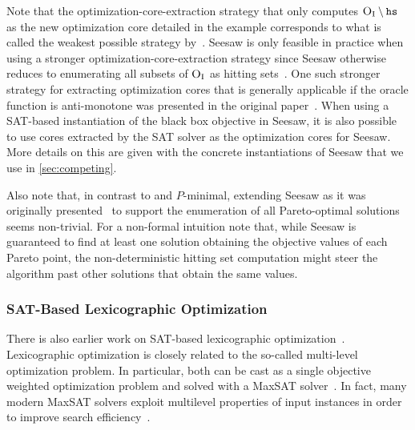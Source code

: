 Note that the optimization-core-extraction strategy that only computes $\textsc{O}_{\text{I}} \setminus \texttt{hs}$ as the new optimization core detailed in the example corresponds to what is called the weakest possible strategy by~\textcite{DBLP:conf/cp/JanotaMSM21}.
Seesaw is only feasible in practice when using a stronger optimization-core-extraction strategy since Seesaw otherwise reduces to enumerating all subsets of $\textsc{O}_{\text{I}}$ as hitting sets~\autocite{DBLP:conf/cp/JanotaMSM21}.
One such stronger strategy for extracting optimization cores that is generally applicable if the oracle function is anti-monotone was presented in the original paper~\autocite{DBLP:conf/cp/JanotaMSM21}.
When using a SAT-based instantiation of the black box objective in Seesaw, it is also possible to use cores extracted by the SAT solver as the optimization cores for Seesaw.
More details on this are given with the concrete instantiations of Seesaw that we use in \cref{sec:competing}.

Also note that, in contrast to \algname{} and $P$-minimal, extending Seesaw as it was originally presented~\autocite{DBLP:conf/cp/JanotaMSM21} to support the enumeration of all Pareto-optimal solutions seems non-trivial.
For a non-formal intuition note that, while Seesaw is guaranteed to find at least one solution obtaining the objective values of each Pareto point, the non-deterministic hitting set computation might steer the algorithm past other solutions that obtain the same values.

\subsubsection{SAT-Based Lexicographic Optimization\label{sec:lex-opt}}

There is also earlier work on SAT-based lexicographic optimization~\autocites{DBLP:journals/ors/EhrgottG00,DBLP:conf/ijcai/ArgelichLS09,DBLP:journals/amai/Marques-SilvaAGL11}. 
Lexicographic optimization is closely related to the so-called multi-level optimization problem.
In particular, both can be cast as a single objective weighted optimization problem and solved with a MaxSAT solver~\autocites{DBLP:conf/ijcai/ArgelichLS09,DBLP:journals/amai/Marques-SilvaAGL11}.
In fact, many modern MaxSAT solvers exploit multilevel properties of input instances in order to improve search efficiency~\autocites{DBLP:conf/vmcai/PaxianRB21,DBLP:conf/cp/AnsoteguiBGL12}.

